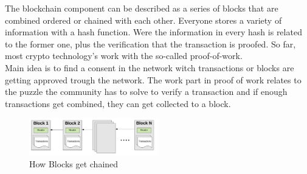 The blockchain component can be described as a series of blocks that are combined ordered or chained with each other. Everyone stores a variety of information with a hash function. Were the information in every hash is related to the former one, plus the verification that the transaction is proofed. So far, most crypto technology’s work with the so-called proof-of-work. \cite{Ray 2018}
\\
Main idea is to find a consent in the network witch transactions or blocks are getting approved trough the network. The work part in proof of work relates to the puzzle the community has to solve to verify a transaction and if enough transactions get combined, they can get collected to a block.

\begin{figure}[ht]
\caption{How Blocks get chained} 
\includegraphics[width=0.5\textwidth]{blockchain}
\end{figure}

